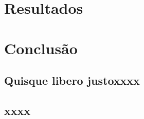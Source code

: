 \documentclass[
	12pt,				%
	openright,			%
	oneside,			%
	a4paper,			%
	chapter=TITLE,		%
	english,			%
	french,				%
	spanish,			%
	brazil				%
	]{abntex2}
\theoremstyle{definition}
\begin{document}
\chapter{Resultados}
\label{cap:resultados}


\chapter{Conclusão}
\label{conclusao}


\postextual





\begin{apendicesenv}
	
	\partapendices
	
\chapter{Quisque libero justoxxxx}


	
\end{apendicesenv}


\begin{anexosenv}
	
	\partanexos
	
    \chapter{xxxx}
   

	
\end{anexosenv}
\end{document}
